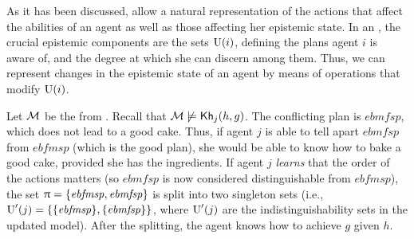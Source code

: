 As it has been discussed,  allow a natural representation of the actions that affect the abilities of an agent as well as those affecting her epistemic state. In an \ults, the crucial epistemic components are the sets $\operatorname{U}(i)$, defining the plans agent $i$ is aware of, and the degree at which she can discern among them. Thus, we can represent changes in the epistemic state of an agent by means of operations that modify $\operatorname{U}(i)$. 

\medskip

\begin{example}\label{ex:ref}
    Let $\mathcal{M}$ be the \ults from .
    Recall that $\mathcal{M}\not\models{\sf Kh}_j(h,g)$. The conflicting plan is $\mathit{ebmfsp}$, which does not lead to a good cake. Thus, if agent $j$ is able to tell apart $\mathit{ebmfsp}$ from $\mathit{ebfmsp}$ (which is the good plan), she would be able to know how to bake a good cake, provided she has the ingredients. If agent $j$ \emph{learns} that the
    order of the actions matters (so $\mathit{ebmfsp}$ is now considered distinguishable from $\mathit{ebfmsp}$), the set $\uppi=\{ \mathit{ebfmsp}, \mathit{ebmfsp} \}$ is split into two singleton sets (i.e., $\operatorname{U}'(j)=\{ \{ \mathit{ebfmsp} \},\{ \mathit{ebmfsp} \} \}$, where $\operatorname{U}'(j)$ are the indistinguishability sets in the updated model). After the splitting, the agent knows how to achieve $g$ given $h$.
\end{example}

\medskip




